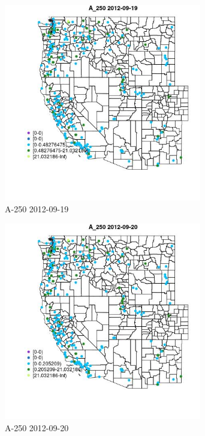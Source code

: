 \begin{figure} 
\centering  
\includegraphics[width=0.77\textwidth]{Code_Outputs/ML_input_report_ML_input_PM25_Step5_part_d_de_duplicated_aves_ML_input_MapObsA_2502012-09-19.jpg} 
\caption{\label{fig:ML_input_report_ML_input_PM25_Step5_part_d_de_duplicated_aves_ML_inputMapObsA_2502012-09-19}A-250 2012-09-19} 
\end{figure} 
 

\begin{figure} 
\centering  
\includegraphics[width=0.77\textwidth]{Code_Outputs/ML_input_report_ML_input_PM25_Step5_part_d_de_duplicated_aves_ML_input_MapObsA_2502012-09-20.jpg} 
\caption{\label{fig:ML_input_report_ML_input_PM25_Step5_part_d_de_duplicated_aves_ML_inputMapObsA_2502012-09-20}A-250 2012-09-20} 
\end{figure} 
 

